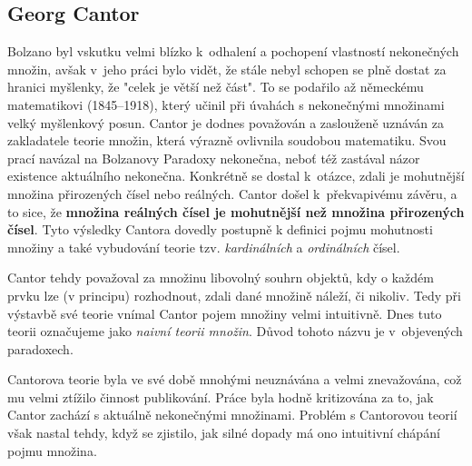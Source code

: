 \subsection{Georg Cantor}\label{subsec:cantor}
Bolzano byl vskutku velmi blízko k~odhalení a pochopení vlastností nekonečných množin, avšak v~jeho práci bylo vidět, že stále nebyl schopen se plně dostat za hranici myšlenky, že "celek je větší než část". To se podařilo až německému matematikovi  (1845--1918), který učinil při úvahách s nekonečnými množinami velký myšlenkový posun. Cantor je dodnes považován a zaslouženě uznáván za zakladatele teorie množin, která výrazně ovlivnila soudobou matematiku. Svou prací navázal na Bolzanovy Paradoxy nekonečna, neboť též zastával názor existence aktuálního nekonečna. Konkrétně se dostal k~otázce, zdali je mohutnější množina přirozených čísel nebo reálných. Cantor došel k~překvapivému závěru, a to sice, že \textbf{množina reálných čísel je mohutnější než množina přirozených čísel}. Tyto výsledky Cantora dovedly postupně k definici pojmu mohutnosti množiny a také vybudování teorie tzv. \emph{kardinálních} a \emph{ordinálních} čísel.\par
Cantor tehdy považoval za množinu libovolný souhrn objektů, kdy o každém prvku lze (v principu) rozhodnout, zdali dané množině náleží, či nikoliv. Tedy při výstavbě své teorie vnímal Cantor pojem množiny velmi intuitivně. Dnes tuto teorii označujeme jako \emph{naivní teorii množin}. Důvod tohoto názvu je v~objevených paradoxech.\par
Cantorova teorie byla ve své době mnohými neuznávána a velmi znevažována, což mu velmi ztížilo činnost publikování. Práce byla hodně kritizována za to, jak Cantor zachází s aktuálně nekonečnými množinami. Problém s Cantorovou teorií však nastal tehdy, když se zjistilo, jak silné dopady má ono intuitivní chápání pojmu množina.

